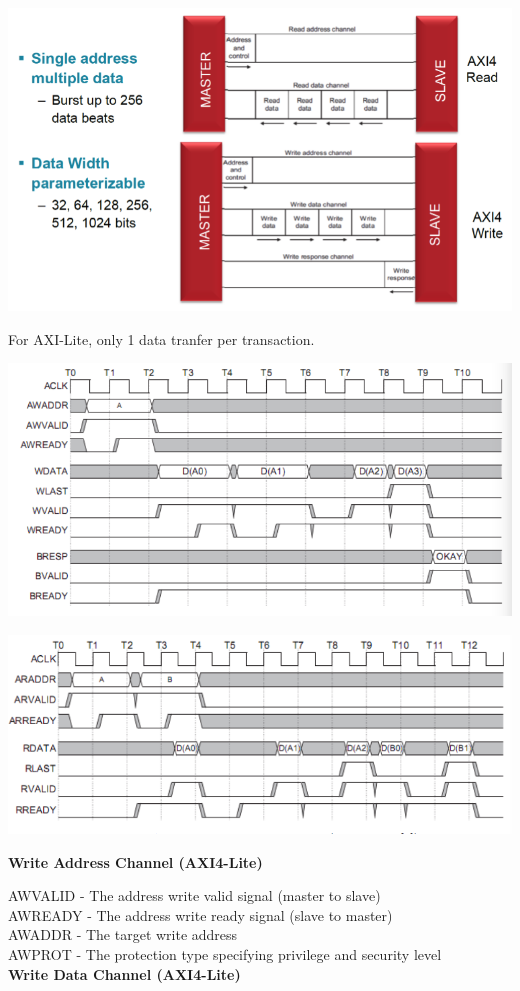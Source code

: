 \documentclass[11pt]{article}
\begin{document}
{    \begin{center}
        \includegraphics[width=300 px]{axi-sm} 
    \end{center}   

    For AXI-Lite, only 1 data tranfer per transaction.

    \begin{center}
        \includegraphics[width=300 px]{axi_read} 
    \end{center}   

    \begin{center}
        \includegraphics[width=300 px]{axi_write} 
    \end{center}   

    \textbf{Write Address Channel (AXI4-Lite)}

    AWVALID - The address write valid signal (master to slave) \\
    AWREADY - The address write ready signal (slave to master)\\
    AWADDR - The target write address \\
    AWPROT - The protection type specifying privilege and security level \\

    \textbf{Write Data Channel (AXI4-Lite)}

}
\end{document}
